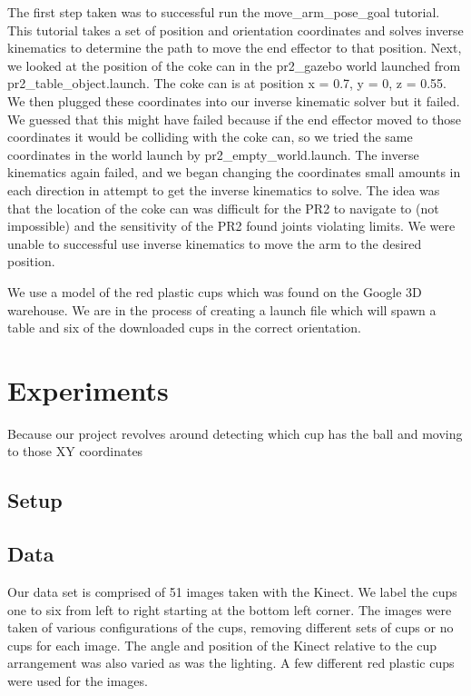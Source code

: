 \documentclass[letterpaper, 10 pt, conference]{ieeeconf}  %
\begin{document}
The first step taken was to successful run the move\_arm\_pose\_goal tutorial. This tutorial takes a set of position and orientation coordinates and solves inverse kinematics to determine the path to move the end effector to that position. Next, we looked at the position of the coke can in the pr2\_gazebo world launched from pr2\_table\_object.launch. The coke can is at position x = 0.7, y = 0, z = 0.55. We then plugged these coordinates into our inverse kinematic solver but it failed. We guessed that this might have failed because if the end effector moved to those coordinates it would be colliding with the coke can, so we tried the same coordinates in the world launch by pr2\_empty\_world.launch. The inverse kinematics again failed, and we began changing the coordinates small amounts in each direction in attempt to get the inverse kinematics to solve. The idea was that the location of the coke can was difficult for the PR2 to navigate to (not impossible) and the sensitivity of the PR2 found joints violating limits. We were unable to successful use inverse kinematics to move the arm to the desired position.

We use a model of the red plastic cups which was found on the Google 3D warehouse. We are in the process of creating a launch file which will spawn a table and six of the downloaded cups in the correct orientation.


\section{Experiments}

Because our project revolves around detecting which cup has the ball and moving to those XY coordinates

\subsection{Setup}

\subsection{Data}

Our data set is comprised of 51 images taken with the Kinect. We label the cups one to six from left to right starting at the bottom left corner. The images were taken of various configurations of the cups, removing different sets of cups or no cups for each image. The angle and position of the Kinect relative to the cup arrangement was also varied as was the lighting.  A few different red plastic cups were used for the images. 
\end{document}
